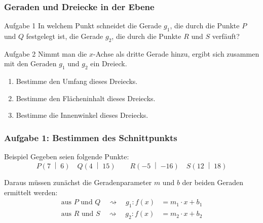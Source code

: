 \documentclass
[
  fontsize = 10pt,
  compress = true,
  ngerman,
  dvipsnames
]
{beamer}
\begin{document}

\newcommand{\sectiontitle}{}

\begin{frame}
  \frametitle{Geraden und Dreiecke in der Ebene}
  \begin{block}{Aufgabe 1}
    In welchem Punkt schneidet die Gerade $g_1$, die durch die Punkte $P$
    und $Q$ festgelegt ist, die Gerade $g_2$, die durch die Punkte $R$ und
    $S$ verfäuft?
  \end{block}
  \begin{block}{Aufgabe 2}
    Nimmt man die $x$-Achse als dritte Gerade hinzu, ergibt sich zusammen
    mit den Geraden $g_1$ und $g_2$ ein Dreieck.
    \begin{enumerate}[{2}.1]
      \item Bestimme den Umfang dieses Dreiecks.
      \item Bestimme den Flächeninhalt dieses Dreiecks.
      \item Bestimme die Innenwinkel dieses Dreiecks.
    \end{enumerate}
  \end{block}
\end{frame}

\renewcommand{\sectiontitle}{Aufgabe 1: Bestimmen des Schnittpunkts}

\newcommand{\PP}{P\left(\num{7}\;\middle|\;\num{6}\right)}
\newcommand{\PQ}{Q\left(\num{4}\;\middle|\;\num{15}\right)}
\newcommand{\PR}{R\left(\num{-5}\;\middle|\;\num{-16}\right)}
\newcommand{\PS}{S\left(\num{12}\;\middle|\;\num{18}\right)}

\begin{frame}
  \frametitle{\sectiontitle}
  \begin{block}{Beispiel}
    Gegeben seien folgende Punkte:
    \begin{equation*}
      \PP \quad \PQ \qquad \PR \quad \PS
    \end{equation*}
  \end{block}
  \bigskip

  Daraus müssen zunächst die Geradenparameter $m$ und $b$
  der beiden Geraden ermittelt werden:
  \begin{equation*}
    \begin{split}
      \text{aus $P$ und $Q$}\quad\rightsquigarrow\quad g_1:f(x)&=m_1\cdot x+b_1 \\[1ex]
      \text{aus $R$ und $S$}\quad\rightsquigarrow\quad g_2:f(x)&=m_2\cdot x+b_2
    \end{split}
  \end{equation*}
\end{frame}
\end{document}
